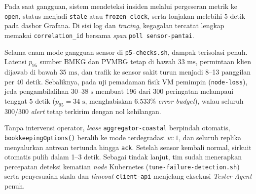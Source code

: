 Pada saat gangguan, sistem mendeteksi insiden melalui pergeseran metrik  ke \texttt{open}, status  menjadi \texttt{stale} atau \texttt{frozen\_clock}, serta lonjakan  melebihi $5\text{ detik}$ pada dasbor Grafana. Di sisi log dan \textit{tracing}, kegagalan tercatat lengkap memakai \texttt{correlation\_id} bersama \textit{span} \texttt{poll sensor-pantai}.

Selama enam mode gangguan sensor di \texttt{p5-checks.sh}, dampak terisolasi penuh. Latensi $p_{95}$ sumber BMKG dan PVMBG tetap di bawah $33\text{ ms}$, permintaan klien dijawab di bawah $35\text{ ms}$, dan trafik ke sensor sakit turun menjadi 8--13 panggilan per 40 detik. Sebaliknya, pada uji pemadaman fisik VM pemimpin (\texttt{node-loss}), jeda pengambilalihan $30$--$38\text{ s}$ membuat $196$ dari $300$ peringatan melampaui tenggat $5\text{ detik}$ ($p_{95} = 34\text{ s}$, menghabiskan $6.533\%$ \textit{error budget}), walau seluruh $300/300$ \textit{alert} tetap terkirim dengan nol kehilangan.

Tanpa intervensi operator, \textit{lease} \texttt{aggregator-\allowbreak coastal} berpindah otomatis, \texttt{bookkeeping\allowbreak Options()} beralih ke mode terdegradasi $w:1$, dan seluruh replika menyalurkan antrean tertunda hingga \texttt{ack}. Setelah sensor kembali normal, sirkuit otomatis pulih dalam 1--3 detik. Sebagai tindak lanjut, tim sudah menerapkan percepatan deteksi kematian \textit{node} Kubernetes (\texttt{tune-\allowbreak failure-\allowbreak detection.sh}) serta penyesuaian skala dan \textit{timeout} \texttt{client-api} menjelang eksekusi \textit{Tester Agent} penuh.
